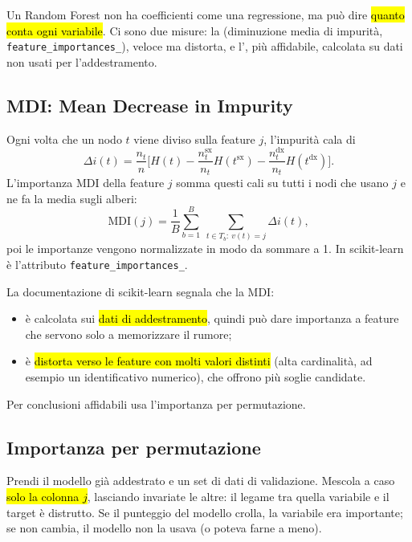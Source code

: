 
\begin{inbreve}
Un Random Forest non ha coefficienti come una regressione, ma può dire \hl{quanto conta ogni variabile}. Ci sono due misure: la  (diminuzione media di impurità, \texttt{feature\_importances\_}), veloce ma distorta, e l', più affidabile, calcolata su dati non usati per l'addestramento.
\end{inbreve}

\subsection{MDI: Mean Decrease in Impurity}

\begin{tecnica}[Definizione]
Ogni volta che un nodo $t$ viene diviso sulla feature $j$, l'impurità cala di
\[
\Delta i(t)=\frac{n_t}{n}\Big[H(t)-\frac{n_{t}^{\mathrm{sx}}}{n_t}H(t^{\mathrm{sx}})-\frac{n_t^{\mathrm{dx}}}{n_t}H(t^{\mathrm{dx}})\Big].
\]
L'importanza MDI della feature $j$ somma questi cali su tutti i nodi che usano $j$ e ne fa la media sugli alberi:
\[
\mathrm{MDI}(j)=\frac1B\sum_{b=1}^{B}\ \sum_{t\in T_b:\ v(t)=j}\Delta i(t),
\]
poi le importanze vengono normalizzate in modo da sommare a 1. In scikit-learn è l'attributo \texttt{feature\_importances\_}.
\end{tecnica}

\begin{attenzione}
La documentazione di scikit-learn segnala che la MDI:
\begin{itemize}
  \item è calcolata sui \hl{dati di addestramento}, quindi può dare importanza a feature che servono solo a memorizzare il rumore;
  \item è \hl{distorta verso le feature con molti valori distinti} (alta cardinalità, ad esempio un identificativo numerico), che offrono più soglie candidate.
\end{itemize}
Per conclusioni affidabili usa l'importanza per permutazione.
\end{attenzione}

\subsection{Importanza per permutazione}

\begin{intuizione}
Prendi il modello già addestrato e un set di dati di validazione. Mescola a caso \hl{solo la colonna $j$}, lasciando invariate le altre: il legame tra quella variabile e il target è distrutto. Se il punteggio del modello crolla, la variabile era importante; se non cambia, il modello non la usava (o poteva farne a meno).
\end{intuizione}

